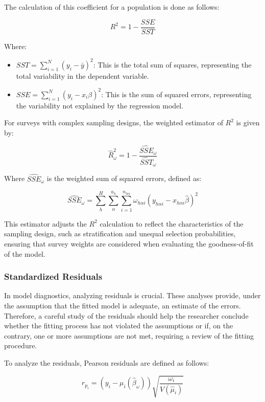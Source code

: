 \documentclass[
  12pt,
]{book}
\providecommand{\tightlist}{%
  \setlength{\itemsep}{0pt}\setlength{\parskip}{0pt}}
\begin{document}
The calculation of this coefficient for a population is done as follows:

\[
R^{2} =  1-\frac{SSE}{SST}
\]

Where:

\begin{itemize}
\tightlist
\item
  \(SST= \sum_{i=1}^N (y_i - \bar{y})^2\): This is the total sum of squares, representing the total variability in the dependent variable.
\item
  \(SSE= \sum_{i=1}^N (y_i - x_i \beta)^2\): This is the sum of squared errors, representing the variability not explained by the regression model.
\end{itemize}

For surveys with complex sampling designs, the weighted estimator of \(R^{2}\) is given by:

\[
\widehat{R}_{\omega}^{2} = 1-\frac{\widehat{SSE}_{\omega}}{\widehat{SST}_{\omega}}
\]

Where \(\widehat{SSE}_{\omega}\) is the weighted sum of squared errors, defined as:

\[
\widehat{SSE}_{\omega}  =  \sum_{h}^{H}\sum_{\alpha}^{a_{h}}\sum_{i=1}^{n_{h\alpha}}\omega_{h\alpha i}\left(y_{h\alpha i}-x_{h\alpha i}\hat{\beta}\right)^{2}
\]

This estimator adjusts the \(R^{2}\) calculation to reflect the characteristics of the sampling design, such as stratification and unequal selection probabilities, ensuring that survey weights are considered when evaluating the goodness-of-fit of the model.

\hypertarget{standardized-residuals}{%
\subsubsection{Standardized Residuals}\label{standardized-residuals}}

In model diagnostics, analyzing residuals is crucial. These analyses provide, under the assumption that the fitted model is adequate, an estimate of the errors. Therefore, a careful study of the residuals should help the researcher conclude whether the fitting process has not violated the assumptions or if, on the contrary, one or more assumptions are not met, requiring a review of the fitting procedure.

To analyze the residuals, Pearson residuals \citep{Heeringa_West_Berglund_2017} are defined as follows:

\[
r_{p_{i}}  =  \left(y_{i}-\mu_{i}\left(\hat{\beta}_{\omega}\right)\right)\sqrt{\frac{\omega_{i}}{V\left(\hat{\mu}_{i}\right)}}
\]
\end{document}
